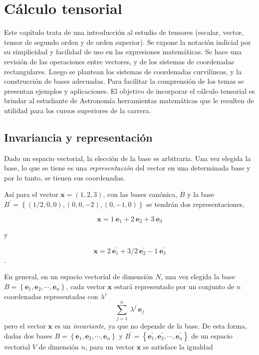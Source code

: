 \chapter{Cálculo tensorial}

Este capítulo trata de una introducción al estudio de tensores (escalar, vector, tensor de segundo orden y de orden superior). Se expone la notación indicial por su simplicidad  y facilidad de uso en las expresiones matemáticas. Se hace una revisión de las operaciones entre vectores, y de los sistemas de  coordenadas rectangulares. Luego se plantean los  sistemas de coordenadas curvilíneas, y la construcción de bases adecuadas. Para facilitar la comprensión  de los temas se presentan ejemplos y aplicaciones. El objetivo de incorporar el cálculo tensorial es  brindar al estudiante de Astronomía  herramientas matemáticas que le resulten de utilidad para los cursos superiores de la carrera.\\%

\section{ Invariancia y representación}





Dado un espacio vectorial, la elección de la base es arbitraria. Una vez elegida la base, lo que se tiene es una \textit{representación} del vector en una determinada base y por lo tanto, se tienen sus coordenadas.


Así para el vector $\mathbf{x}=(1,2,3)$, con las bases canónica, $B$ y la base $B^{\prime} =\left\{(1/2,0,0), (0,0,-2),(0,-1,0)\right\}$  se tendrán dos representaciones, 

$$\mathbf{x}= 1~\mathbf{e}_1+2~\mathbf{e}_2 +3~\mathbf{e}_3 $$

y 

$$\mathbf{x}= 2~\mathbf{e}^{\prime}_1+3/2~\mathbf{e}^{\prime}_2 -1~\mathbf{e}^{\prime}_3 $$.


En general, en un espacio vectorial de dimensión $N$, una vez elegida la base $B= \left\{\mathbf{e}_1,\mathbf{e}_2,\cdots, \mathbf{e}_n\right\}$, cada vector $\mathbf{x}$ estará representado por un conjunto de $n$ coordenadas representadas con $\lambda^j$
$$\sum_{j=1}^n~\lambda^j~\mathbf{e}_j$$
pero el  vector $\mathbf{x}$ es un \textit{invariante}, ya que  no depende de la base. De esta forma, dadas dos bases $B= \left\{\mathbf{e}_1,\mathbf{e}_2,\cdots, \mathbf{e}_n\right\}$  y $B ^{\prime}=\left\{\mathbf{e}^{\prime}_1,\mathbf{e}^{\prime}_2,\cdots, \mathbf{e}^{\prime}_n \right\}$  de un espacio vectorial $V$ de dimensión $n$, para un vector $\mathbf{x}$ se satisface la igualdad

